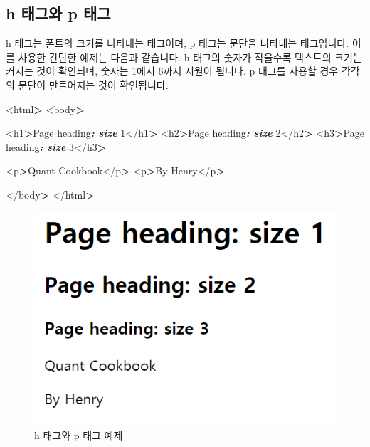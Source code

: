 \documentclass[12pt,]{book}
\newenvironment{Shaded}{\begin{snugshade}}{\end{snugshade}}
\newcommand{\InformationTok}[1]{\textcolor[rgb]{0.56,0.35,0.01}{\textbf{\textit{#1}}}}
\newcommand{\NormalTok}[1]{#1}
\newcommand{\OperatorTok}[1]{\textcolor[rgb]{0.81,0.36,0.00}{\textbf{#1}}}
\begin{document}
\hypertarget{h--p-}{%
\subsection{h 태그와 p 태그}\label{h--p-}}

h 태그는 폰트의 크기를 나타내는 태그이며, p 태그는 문단을 나타내는 태그입니다. 이를 사용한 간단한 예제는 다음과 같습니다. h 태그의 숫자가 작을수록 텍스트의 크기는 커지는 것이 확인되며, 숫자는 1에서 6까지 지원이 됩니다. p 태그를 사용할 경우 각각의 문단이 만들어지는 것이 확인됩니다.

\begin{Shaded}
\begin{Highlighting}[]
\NormalTok{<html}\OperatorTok{>}
\NormalTok{<body}\OperatorTok{>}

\NormalTok{<h1}\OperatorTok{>}\NormalTok{Page heading}\InformationTok{: size}\NormalTok{ 1</h1}\OperatorTok{>}
\NormalTok{<h2}\OperatorTok{>}\NormalTok{Page heading}\InformationTok{: size}\NormalTok{ 2</h2}\OperatorTok{>}
\NormalTok{<h3}\OperatorTok{>}\NormalTok{Page heading}\InformationTok{: size}\NormalTok{ 3</h3}\OperatorTok{>}

\NormalTok{<p}\OperatorTok{>}\NormalTok{Quant Cookbook</p}\OperatorTok{>}
\NormalTok{<p}\OperatorTok{>}\NormalTok{By Henry</p}\OperatorTok{>}

\NormalTok{</body}\OperatorTok{>}
\NormalTok{</html}\OperatorTok{>}
\end{Highlighting}
\end{Shaded}

\begin{figure}[h]

{\centering \includegraphics[width=0.7\linewidth]{images/html_3} 

}

\caption{h 태그와 p 태그 예제}\label{fig:unnamed-chunk-10}
\end{figure}
\end{document}
